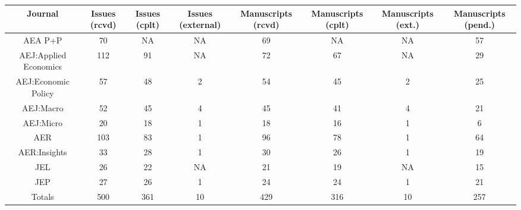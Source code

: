 
\begin{tabular}{@{\extracolsep{5pt}} cccccccc} 
\toprule 
Journal & Issues (rcvd) & Issues (cplt) & Issues (external) & Manuscripts (rcvd) & Manuscripts (cplt) & Manuscripts (ext.) & Manuscripts (pend.) \\ 
\midrule AEA P+P & 70 & NA & NA & 69 & NA & NA & 57 \\ 
AEJ:Applied Economics & 112 & 91 & NA & 72 & 67 & NA & 29 \\ 
AEJ:Economic Policy & 57 & 48 & 2 & 54 & 45 & 2 & 25 \\ 
AEJ:Macro & 52 & 45 & 4 & 45 & 41 & 4 & 21 \\ 
AEJ:Micro & 20 & 18 & 1 & 18 & 16 & 1 & 6 \\ 
AER & 103 & 83 & 1 & 96 & 78 & 1 & 64 \\ 
AER:Insights & 33 & 28 & 1 & 30 & 26 & 1 & 19 \\ 
JEL & 26 & 22 & NA & 21 & 19 & NA & 15 \\ 
JEP & 27 & 26 & 1 & 24 & 24 & 1 & 21 \\ 
Totals & 500 & 361 & 10 & 429 & 316 & 10 & 257 \\ 
\bottomrule 
\end{tabular} 
